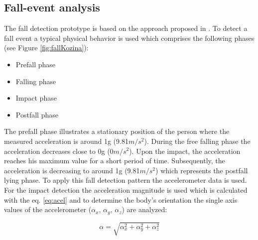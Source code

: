 \documentclass[10pt,journal,compsoc]{IEEEtran}
\begin{document}
\subsection{Fall-event analysis}
\label{subsec:fall-analysis}
The fall detection prototype is based on the approach proposed in \cite{Gjoreski2014, Kozina}. To detect a fall event a typical physical behavior is used which comprises the following phases (see Figure \ref{fig:fallKozina}):
\begin{itemize}
	\item Prefall phase 
	\item Falling phase
	\item Impact phase
	\item Postfall phase
\end{itemize}
The prefall phase illustrates a stationary position of the person where the measured acceleration is around 1g (9.81$m/s^{2}$). During the free falling phase the  acceleration decreases close to 0g (0$m/s^{2}$). Upon the impact, the acceleration reaches his maximum value for a short period of time. Subsequently, the acceleration is decreasing to around 1g (9.81$m/s^{2}$) which represents the postfall lying phase. To apply this fall detection pattern the accelerometer data is used. For the impact detection the acceleration magnitude is used which is calculated with the eq. \ref{eq:acel} and to determine the body's orientation the single axis values of the accelerometer ($\alpha_x$, $\alpha_y$, $\alpha_z$) are analyzed:

\begin{equation}\label{eq:acel}
\alpha = \sqrt{\alpha_{x}^{2} + \alpha_{y}^{2} + \alpha_{z}^{2}}
\end{equation}
\end{document}
